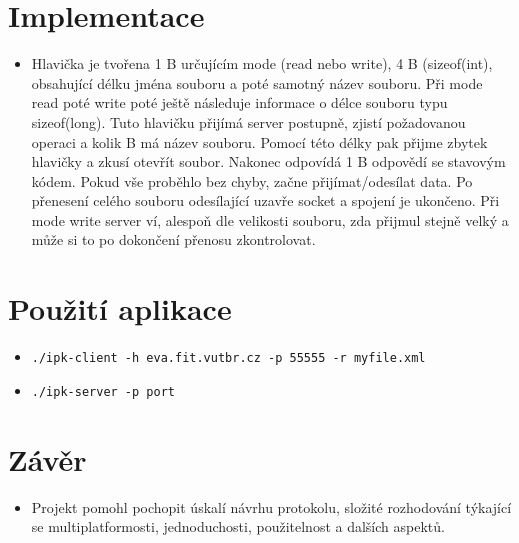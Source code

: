 \documentclass[a4paper,11pt]{article}
\begin{document}
\section*{Implementace}
\begin{itemize}
  \item Hlavička je tvořena 1 B určujícím mode (read nebo write), 4 B (sizeof(int), obsahující délku jména souboru a poté samotný název souboru. Při mode read poté write poté ještě následuje informace o délce souboru typu sizeof(long).
Tuto hlavičku přijímá server postupně, zjistí požadovanou operaci a kolik B má název souboru. Pomocí této délky
pak přijme zbytek hlavičky a zkusí otevřít soubor. Nakonec odpovídá 1 B odpovědí se
stavovým kódem. Pokud vše proběhlo bez chyby, začne přijímat/odesílat data.
Po přenesení celého souboru odesílající uzavře socket a spojení je ukončeno. Při mode write server ví, alespoň dle velikosti souboru,
zda přijmul stejně velký a může si to po dokončení přenosu zkontrolovat.
\end{itemize}

\section*{Použití aplikace}
\begin{itemize}

  \item
  \lstset{language=Bash}
  \begin{lstlisting}[frame=single,breaklines]
    ./ipk-client -h eva.fit.vutbr.cz -p 55555 -r myfile.xml
  \end{lstlisting}

  \item
  \lstset{language=Bash}
  \begin{lstlisting}[frame=single,breaklines]
    ./ipk-server -p port
  \end{lstlisting}

\end{itemize}

\section*{Závěr}
\begin{itemize}
  \item Projekt pomohl pochopit úskalí návrhu protokolu, složité rozhodování týkající se multiplatformosti, jednoduchosti, použitelnost a dalších aspektů.
\end{itemize}

\nocite{*}




\newpage
\thispagestyle{empty}
\end{document}
